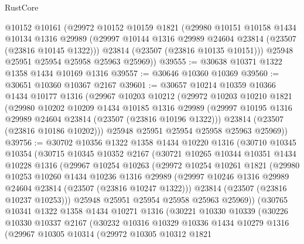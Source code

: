 \begin{lexlean}{RustCore}
\begin{coremodule}
      @10152
      @10161
      (@29972
        @10152
        @10159
        @1821
        (@29980
          @10151
          @10158
          @1434
          @10134
          @1316
          @29989
          (@29997 @10144 @1316 @29989 @24604 @23814 (@23507 (@23816 @10145 @1322)))
          @23814
          (@23507 (@23816 @10135 @10151)))
        @25948
        @25951
        @25954
        @25958
        @25963
        @25969))
@39555 := @30638 @10371 @1322 @1358 @1434 @10169 @1316
@39557 := @30646 @10360 @10369
@39560 := @30651 @10360 @10367 @2167
@39601 := @30657
    @10214
    @10359
    @10366
    @1434
    @10177
    @1316
    (@29967
      @10203
      @10212
      (@29972
        @10203
        @10210
        @1821
        (@29980
          @10202
          @10209
          @1434
          @10185
          @1316
          @29989
          (@29997 @10195 @1316 @29989 @24604 @23814 (@23507 (@23816 @10196 @1322)))
          @23814
          (@23507 (@23816 @10186 @10202)))
        @25948
        @25951
        @25954
        @25958
        @25963
        @25969))
@39756 := @30702
    @10356
    @1322
    @1358
    @1434
    @10220
    @1316
    (@30710
      @10345
      @10354
      (@30715
        @10345
        @10352
        @2167
        (@30721
          @10265
          @10344
          @10351
          @1434
          @10228
          @1316
          (@29967
            @10254
            @10263
            (@29972
              @10254
              @10261
              @1821
              (@29980
                @10253
                @10260
                @1434
                @10236
                @1316
                @29989
                (@29997 @10246 @1316 @29989 @24604 @23814 (@23507 (@23816 @10247 @1322)))
                @23814
                (@23507 (@23816 @10237 @10253)))
              @25948
              @25951
              @25954
              @25958
              @25963
              @25969))
          (@30765
            @10341
            @1322
            @1358
            @1434
            @10271
            @1316
            (@30221
              @10330
              @10339
              (@30226
                @10330
                @10337
                @2167
                (@30232
                  @10316
                  @10329
                  @10336
                  @1434
                  @10279
                  @1316
                  (@29967
                    @10305
                    @10314
                    (@29972
                      @10305
                      @10312
                      @1821

\end{coremodule}
\end{lexlean}
